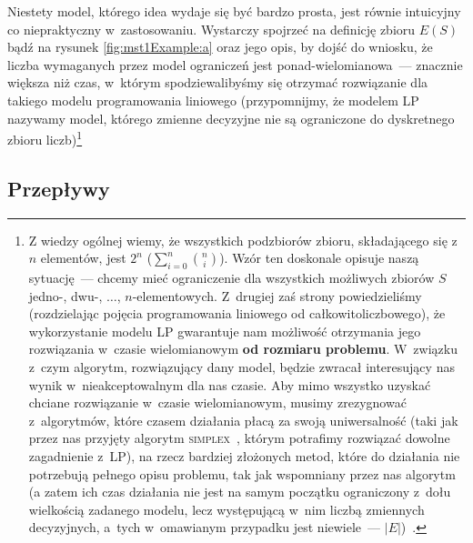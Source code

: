 Niestety model, którego idea wydaje się być bardzo prosta, jest równie intuicyjny co niepraktyczny w~zastosowaniu.
Wystarczy spojrzeć na definicję zbioru $E \left( S \right)$ bądź na rysunek \ref{fig:mst1Example:a} oraz jego opis, by dojść do wniosku, że liczba wymaganych przez model ograniczeń jest ponad-wielomianowa~--- znacznie większa niż czas, w~którym spodziewalibyśmy się otrzymać rozwiązanie dla takiego modelu programowania liniowego (przypomnijmy, że modelem \textsc{LP} nazywamy model, którego zmienne decyzyjne nie są ograniczone do dyskretnego zbioru liczb)\footnote{
	Z wiedzy ogólnej wiemy, że wszystkich podzbiorów zbioru, składającego się z~$n$ elementów, jest $2^{n}$ ($\sum_{i=0}^{n} \binom{n}{i}$).
	Wzór ten doskonale opisuje naszą sytuację~--- chcemy mieć ograniczenie dla wszystkich możliwych zbiorów $S$ jedno-, dwu-, $\dots$, $n$-elementowych.
	Z~drugiej zaś strony powiedzieliśmy (rozdzielając pojęcia programowania liniowego od całkowitoliczbowego), że wykorzystanie modelu \textsc{LP} gwarantuje nam możliwość otrzymania jego rozwiązania w~czasie wielomianowym \textbf{od rozmiaru problemu}.
	W~związku z~czym algorytm, rozwiązujący dany model, będzie zwracał interesujący nas wynik w~nieakceptowalnym dla nas czasie.
	Aby mimo wszystko uzyskać chciane rozwiązanie w~czasie wielomianowym, musimy zrezygnować z~algorytmów, które czasem działania płacą za swoją uniwersalność (taki jak przez nas przyjęty algorytm \textsc{simplex}~\cite{Gass2011}, którym potrafimy rozwiązać dowolne zagadnienie z~\textsc{LP}), na rzecz bardziej złożonych metod, które do działania nie potrzebują pełnego opisu problemu, tak jak wspomniany przez nas algorytm (a zatem ich czas działania nie jest na samym początku ograniczony z~dołu wielkością zadanego modelu, lecz występującą w~nim liczbą zmiennych decyzyjnych, a~tych w~omawianym przypadku jest niewiele~--- $\left| E \right|$)~\cite{DBLP:conf/icalp/BeiCZ15}.
}



\subsection{Przepływy}



